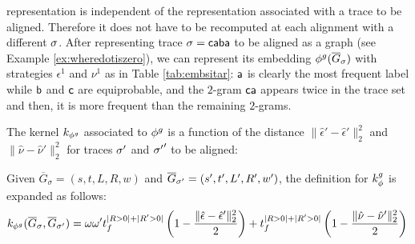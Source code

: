 \begin{example}
representation is independent of the representation associated with a trace to be aligned. Therefore it does not have to be recomputed at each alignment with a different $\sigma$.
{After representing trace $\sigma=\mathsf{caba}$ to be aligned as a graph (see Example \ref{ex:wheredotiszero}), we can represent its}
embedding $\phi^{g}(\overline{G}_{\sigma})$ with strategies $\epsilon^1$ and $\nu^1$ %
{as} in Table \ref{tab:embsitar}: $\mathsf{a}$ is clearly the most frequent label while $\mathsf{b}$ and $\mathsf{c}$ are equiprobable, and the $2$-gram $\mathsf{ca}$ appears twice in the trace set and then, it is more frequent than the remaining $2$-grams.
\end{example}
%
%
The kernel $k_{\phi^{g}}$ associated to $\phi^{g}$ is
{ a function of the distance  $\|\hat{\epsilon}'-\hat{\epsilon}'\|_2^2$ and $\|\hat{\nu}-\hat{\nu}'\|_2^2$ for traces ${\sigma'}$ and ${{\sigma'}}'$ to be aligned:}
%
\begin{proposition}\label{lem:rewritinglemma}
Given  $\overline{G}_\sigma=(s,t,L,R,w)$ and $\overline{G}_{{\sigma'}}=(s',t',L',R',w')$, the definition for $k_\phi^{g}$ is expanded as follows:
$$
k_{\phi^{g}}(\overline{G}_\sigma,\overline{G}_{{\sigma'}})=\omega\omega't_f^{|R>0|+|R'>0|}\left(1-\frac{\|\hat{\epsilon}-\hat{\epsilon}'\|_{2}^2}{2}\right)+t_f^{|R>0|+|R'>0|}\left(1-\frac{\|\hat{\nu}-\hat{\nu}'\|_{2}^2}{2}\right)\\$$
\end{proposition}

